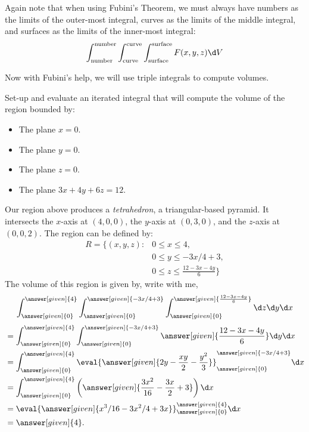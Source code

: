 \documentclass{ximera}
\begin{document}
Again note that when using Fubini's Theorem, we must always have
numbers as the limits of the outer-most integral, curves as the limits
of the middle integral, and surfaces as the limits of the inner-most
integral:
\[
\int_{\text{number}}^{\text{number}}\int_{\text{curve}}^{\text{curve}}\int_{\text{surface}}^{\text{surface}}
F(x,y,z) \d V
\]


Now with Fubini's help, we will use triple integrals to compute
volumes.

\begin{example}
  Set-up and evaluate an iterated integral that will compute the
  volume of the region bounded by:
  \begin{itemize}
  \item The plane $x=0$.
  \item The plane $y=0$.
  \item The plane $z=0$.
  \item The plane $3x + 4y + 6z = 12$.
  \end{itemize}
  \begin{explanation}
    Our region above produces a
    \textit{tetrahedron}, a triangular-based
    pyramid. It intersects the $x$-axis at $(4,0,0)$, the $y$-axis at
    $(0,3,0)$, and the $z$-axis at $(0,0,2)$.  The region can be
    defined by:
    \begin{align*}
      R=\Big\{(x,y,z):&0\leq x\leq 4, \\
      &0\leq y\leq -3x/4+3, \\
      &0\leq z \leq \frac{12-3x-4y}{6}\Big\}
    \end{align*}
    The volume of this region is given by, write with me, 
    \[
    \int_{\answer[given]{0}}^{\answer[given]{4}} \int_{\answer[given]{0}}^{\answer[given]{-3x/4+3}} \int_{\answer[given]{0}}^{\answer[given]{\frac{12-3x-4y}{6}}}\d z \d y\d x 
    \]
    \begin{align*}
      &=\int_{\answer[given]{0}}^{\answer[given]{4}} \int_{\answer[given]{0}}^{\answer[given]{-3x/4+3}} \answer[given]{\frac{12-3x-4y}{6}} \d y \d x\\
      &= \int_{\answer[given]{0}}^{\answer[given]{4}}  \eval{\answer[given]{2y-\frac{xy}{2}-\frac{y^2}{3}}}_{\answer[given]{0}}^{\answer[given]{-3x/4+3}} \d x\\
      &= \int_{\answer[given]{0}}^{\answer[given]{4}}  \left(\answer[given]{\frac{3x^2}{16} -\frac{3x}{2}+3}\right) \d x\\
      &= \eval{\answer[given]{x^3/16-3x^2/4+3x}}_{\answer[given]{0}}^{\answer[given]{4}} \d x\\
      &=\answer[given]{4}.
    \end{align*}    
  \end{explanation}
\end{example}
\end{document}
